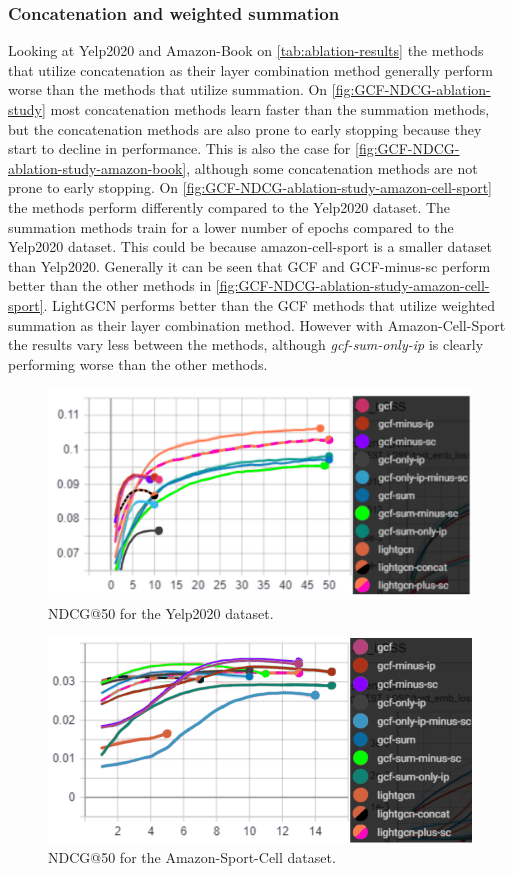 \subsubsection{Concatenation and weighted summation}
Looking at Yelp2020 and Amazon-Book on \autoref{tab:ablation-results} the methods that utilize concatenation as their layer combination method generally perform worse than the methods that utilize summation.
On \autoref{fig:GCF-NDCG-ablation-study} most concatenation methods learn faster than the summation methods, but the concatenation methods are also prone to early stopping because they start to decline in performance.
This is also the case for \autoref{fig:GCF-NDCG-ablation-study-amazon-book}, although some concatenation methods are not prone to early stopping.
On \autoref{fig:GCF-NDCG-ablation-study-amazon-cell-sport} the methods perform differently compared to the Yelp2020 dataset.
The summation methods train for a lower number of epochs compared to the Yelp2020 dataset.
This could be because amazon-cell-sport is a smaller dataset than Yelp2020.
Generally it can be seen that GCF and GCF-minus-sc perform better than the other methods in \autoref{fig:GCF-NDCG-ablation-study-amazon-cell-sport}.
LightGCN performs better than the GCF methods that utilize weighted summation as their layer combination method.
However with Amazon-Cell-Sport the results vary less between the methods, although \textit{gcf-sum-only-ip} is clearly performing worse than the other methods.
\begin{figure}[]
    \includegraphics[width=\linewidth]{figures/gcf-all-ndcg.png}
    \caption{NDCG@50 for the Yelp2020 dataset.}
    \label{fig:GCF-NDCG-ablation-study}
\end{figure}
\begin{figure}[]
    \includegraphics[width=\linewidth]{figures/amazon-cell-sport-gcf-all-ndcg.png}
    \caption{NDCG@50 for the Amazon-Sport-Cell dataset.}
    \label{fig:GCF-NDCG-ablation-study-amazon-cell-sport}
\end{figure}
